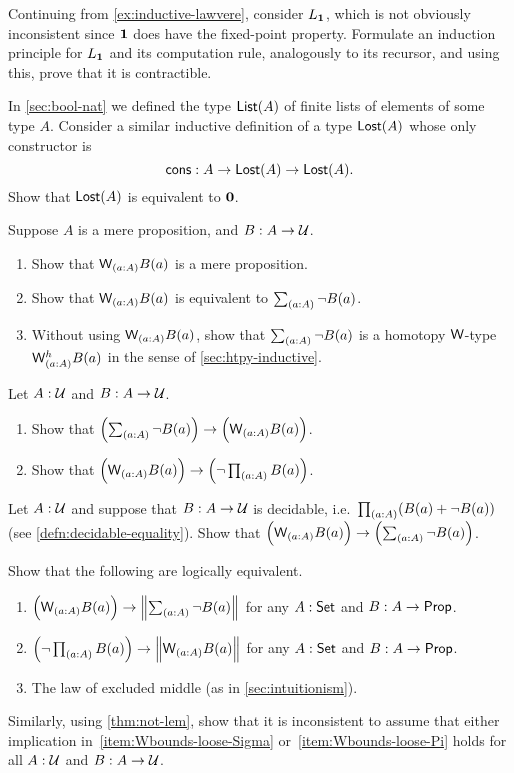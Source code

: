 \documentclass[hott-all.tex]{subfiles}
\begin{document}
% 
\begin{ex}
  Continuing from \cref{ex:inductive-lawvere}, consider $L_\mathbf{1}$, which is not obviously inconsistent since $\mathbf{1}$ does have the fixed-point property.
  Formulate an induction principle for $L_\mathbf{1}$ and its computation rule, analogously to its recursor, and using this, prove that it is contractible.
\end{ex}
% 
\begin{ex}
In \cref{sec:bool-nat} we defined the type $\mathsf{List}(A)$ of finite lists of elements of some type $A$.
Consider a similar inductive definition of a type $\mathsf{Lost}(A)$ whose only constructor is
\[ \mathsf{cons}: A \to \mathsf{Lost}(A) \to \mathsf{Lost}(A). \]
Show that $\mathsf{Lost}(A)$ is equivalent to $\mathbf{0}$.
\end{ex}
% 
\begin{ex}
  Suppose $A$ is a mere proposition, and $B:A\to \mathcal{U}$.
  \begin{enumerate}
  \item Show that $\wtype{a:A} B(a)$ is a mere proposition.
  \item Show that $\wtype{a:A} B(a)$ is equivalent to $\sm{a:A} \neg B(a)$.
  \item Without using $\wtype{a:A} B(a)$, show that $\sm{a:A} \neg B(a)$ is a homotopy $\mathsf{W}$-type $\wtypeh{a:A} B(a)$ in the sense of \cref{sec:htpy-inductive}.
  \end{enumerate}
\end{ex}
% 
\begin{ex}
  Let $A:\mathcal{U}$ and $B:A\to \mathcal{U}$.
  \begin{enumerate}
  \item Show that $\Parens{\sm{a:A} \neg B(a)} \to \Parens{\wtype{a:A} B(a)}$.
  \item Show that $\Parens{\wtype{a:A} B(a)} \to \Parens{\neg \prd{a:A} B(a)}$.
  \end{enumerate}
\end{ex}
% 
\begin{ex}
  Let $A:\mathcal{U}$ and suppose that $B:A\to \mathcal{U}$ is decidable, i.e.\ $\prd{a:A} (B(a)+\neg B(a))$ (see \cref{defn:decidable-equality}).
  Show that $\Parens{\wtype{a:A} B(a)} \to \Parens{\sm{a:A} \neg B(a)}$.
\end{ex}
% 
\begin{ex}
  Show that the following are logically equivalent.
  \begin{enumerate}
  \item $\Parens{\wtype{a:A} B(a)} \to \Brck{\sm{a:A} \neg B(a)}$ for any $A:\mathsf{Set}$ and $B:A\to \mathsf{Prop}$.
  \item $\Parens{\neg \prd{a:A} B(a)} \to \Brck{\wtype{a:A} B(a)}$ for any $A:\mathsf{Set}$ and $B:A\to \mathsf{Prop}$.
  \item The law of excluded middle (as in \cref{sec:intuitionism}).
  \end{enumerate}
  Similarly, using \cref{thm:not-lem}, show that it is inconsistent to assume that either implication in~\ref{item:Wbounds-loose-Sigma} or~\ref{item:Wbounds-loose-Pi} holds for all $A:\mathcal{U}$ and $B:A\to \mathcal{U}$.
\end{ex}
\end{document}
